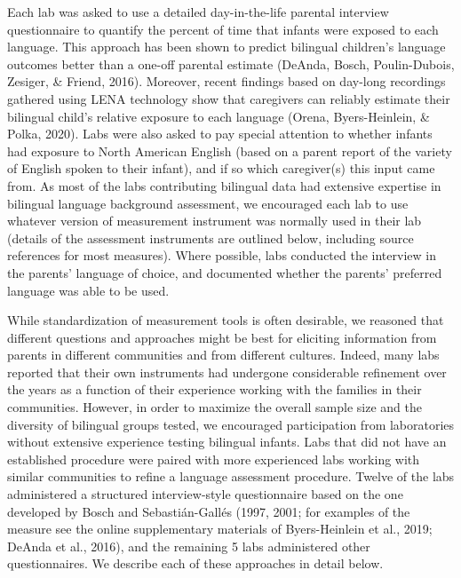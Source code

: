 \documentclass[
  english,
  ,man,floatsintext]{apa6}
\begin{document}
Each lab was asked to use a detailed day-in-the-life parental interview questionnaire to quantify the percent of time that infants were exposed to each language. This approach has been shown to predict bilingual children's language outcomes better than a one-off parental estimate (DeAnda, Bosch, Poulin-Dubois, Zesiger, \& Friend, 2016). Moreover, recent findings based on day-long recordings gathered using LENA technology show that caregivers can reliably estimate their bilingual child's relative exposure to each language (Orena, Byers-Heinlein, \& Polka, 2020). Labs were also asked to pay special attention to whether infants had exposure to North American English (based on a parent report of the variety of English spoken to their infant), and if so which caregiver(s) this input came from. As most of the labs contributing bilingual data had extensive expertise in bilingual language background assessment, we encouraged each lab to use whatever version of measurement instrument was normally used in their lab (details of the assessment instruments are outlined below, including source references for most measures). Where possible, labs conducted the interview in the parents' language of choice, and documented whether the parents' preferred language was able to be used.

While standardization of measurement tools is often desirable, we reasoned that different questions and approaches might be best for eliciting information from parents in different communities and from different cultures. Indeed, many labs reported that their own instruments had undergone considerable refinement over the years as a function of their experience working with the families in their communities. However, in order to maximize the overall sample size and the diversity of bilingual groups tested, we encouraged participation from laboratories without extensive experience testing bilingual infants. Labs that did not have an established procedure were paired with more experienced labs working with similar communities to refine a language assessment procedure. Twelve of the labs administered a structured interview-style questionnaire based on the one developed by Bosch and Sebastián-Gallés (1997, 2001; for examples of the measure see the online supplementary materials of Byers-Heinlein et al., 2019; DeAnda et al., 2016), and the remaining 5 labs administered other questionnaires. We describe each of these approaches in detail below.
\end{document}
